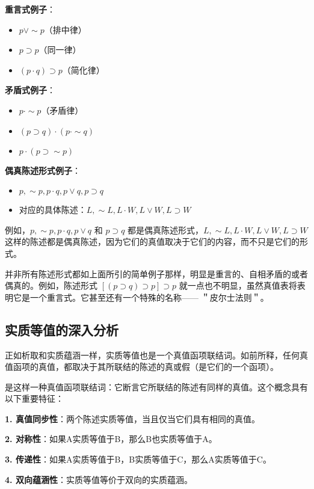 \begin{examplebox}[title=三类陈述形式的对比分析]
\textbf{重言式例子}：
\begin{itemize}
\item $p \vee \sim p$（排中律）
\item $p \supset p$（同一律）
\item $(p \cdot q) \supset p$（简化律）
\end{itemize}

\textbf{矛盾式例子}：
\begin{itemize}
\item $p \cdot \sim p$（矛盾律）
\item $(p \supset q) \cdot (p \cdot \sim q)$
\item $p \cdot (p \supset \sim p)$
\end{itemize}

\textbf{偶真陈述形式例子}：
\begin{itemize}
\item $p, \sim p, p \cdot q, p \vee q, p \supset q$
\item 对应的具体陈述：$L, \sim L, L \cdot W, L \vee W, L \supset W$
\end{itemize}
\end{examplebox}

例如，$p, \sim p, p \cdot q, p \vee q$ 和 $p \supset q$ 都是偶真陈述形式，$L, \sim L, L \cdot W, L \vee W, L \supset W$ 这样的陈述都是偶真陈述，因为它们的真值取决于它们的内容，而不只是它们的形式。

并非所有陈述形式都如上面所引的简单例子那样，明显是重言的、自相矛盾的或者偶真的。例如，陈述形式 $[(p \supset q) \supset p] \supset p$ 就一点也不明显，虽然真值表将表明它是一个重言式。它甚至还有一个特殊的名称—— ＂皮尔士法则＂。

\subsection{实质等值的深入分析}

正如析取和实质蕴涵一样，实质等值也是一个真值函项联结词。如前所释，任何真值函项的真值，都取决于其所联结的陈述的真或假（是它们的一个函项）。

\begin{theorembox}[title=实质等值的概念分析]
是这样一种真值函项联结词：它断言它所联结的陈述有同样的真值。这个概念具有以下重要特征：

\textbf{1. 真值同步性}：两个陈述实质等值，当且仅当它们具有相同的真值。

\textbf{2. 对称性}：如果A实质等值于B，那么B也实质等值于A。

\textbf{3. 传递性}：如果A实质等值于B，B实质等值于C，那么A实质等值于C。

\textbf{4. 双向蕴涵性}：实质等值等价于双向的实质蕴涵。
\end{theorembox}

